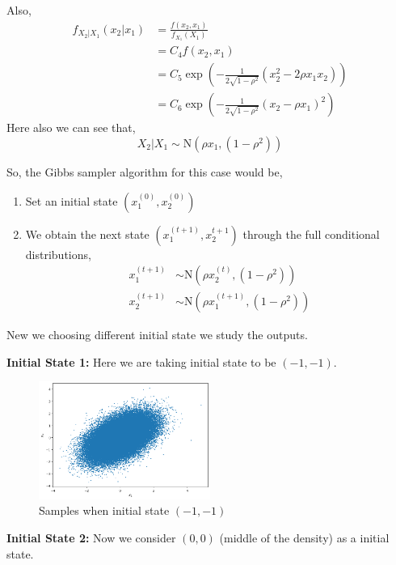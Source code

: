 \begin{example}
    Also, 
    \begin{align*}
        f_{X_2|X_1} (x_2|x_1) &= \frac{f(x_2,x_1)}{f_{X_1}(X_1)} \\ 
                    &=C_4 f(x_2,x_1) \\
                    &=C_5 \exp \left( - \frac{1}{2 \sqrt{1-\rho^2}} (x_2^2 - 2 \rho x_1x_2) \right) \\
                    &= C_6 \exp \left(- \frac{1}{2 \sqrt{1-\rho^2}} (x_2 - \rho x_1)^2   \right)
    \end{align*}
    Here also we can see that,
    \[
        X_2|X_1 \sim \text{N}\left(\rho x_1, (1-\rho^2)\right)
    \]

    So, the Gibbs sampler algorithm for this case would be,
    \begin{enumerate}
        \item Set an initial state $ \left(x_1^{(0)} , x_2^{(0)} \right) $
        \item We obtain the next state $ \left( x_1^{(t+1)} , x_2^{t+1} \right) $ through the full conditional distributions, 
            \begin{align*}
                x_1^{(t+1)} &\sim \text{N}\left(\rho x_2^{(t)}, (1-\rho^2) \right) \\
                x_2 ^{(t+1)} &\sim \text{N}\left(\rho x_1^{(t+1)}, (1-\rho^2) \right) 
            \end{align*}
    \end{enumerate}
    New we choosing different initial state we study the outputs.

    \textbf{Initial State 1:} Here we are taking initial state to be $(-1,-1)$. 
    \begin{figure}[H]
        \centering
        \includegraphics[width=0.5\textwidth]{images/gibbs/example1/init1.png}
        \caption{Samples when initial state $(-1,-1)$}
    \end{figure}

    \textbf{Initial State 2:} Now we consider $(0,0)$ (middle of the density) as a initial state. 


\end{example}
